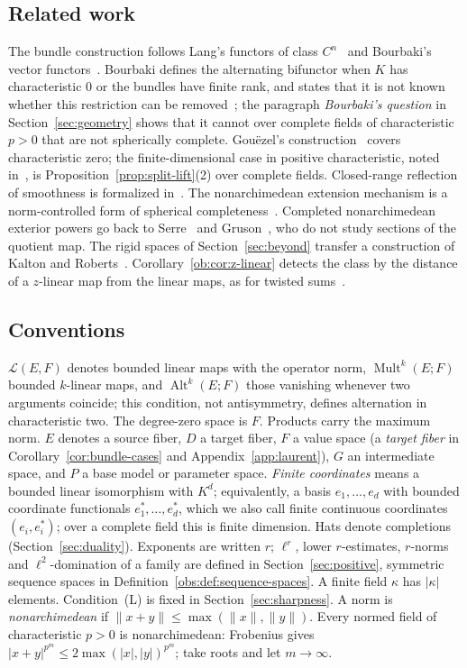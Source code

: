 \documentclass[11pt]{amsart}
\theoremstyle{definition}
\theoremstyle{remark}
\numberwithin{equation}{section}
\newcommand{\cL}{\mathcal L}
\newcommand{\Alt}{\operatorname{Alt}}
\newcommand{\Mult}{\operatorname{Mult}}
\newcommand{\abs}[1]{\lvert #1\rvert}
\newcommand{\norm}[1]{\lVert #1\rVert}
\theoremstyle{plain}
\theoremstyle{definition}
\theoremstyle{plain}
\begin{document}
\subsection*{Related work}
The bundle construction follows Lang's functors of class $C^n$~\cite[Ch.~III, \S4]{La} and Bourbaki's vector
functors~\cite[n\textsuperscript{o}~7.6]{Bou}. Bourbaki defines the alternating bifunctor when $K$ has characteristic
$0$ or the bundles have finite rank, and states that it is not known whether this restriction can be
removed~\cite[n\textsuperscript{o}~7.8]{Bou}; the paragraph \emph{Bourbaki's question} in Section~\ref{sec:geometry}
shows that it cannot over complete fields of characteristic $p>0$ that are not spherically complete. Gou\"ezel's
construction~\cite{G1,G2} covers characteristic zero; the finite-dimensional case in positive characteristic, noted
in~\cite{G1}, is Proposition~\ref{prop:split-lift}(2) over complete fields. Closed-range reflection of smoothness is
formalized in~\cite{PR}. The nonarchimedean extension mechanism is a norm-controlled form of spherical
completeness~\cite{In,Schi,Sch,Yuan}. Completed nonarchimedean exterior powers go back to Serre~\cite{Se} and
Gruson~\cite{Gr}, who do not study sections of the quotient map. The rigid spaces of Section~\ref{sec:beyond} transfer a construction of Kalton and Roberts~\cite{KR}.
Corollary~\ref{ob:cor:z-linear} detects the class by the distance of a $z$-linear map from the linear maps, as for
twisted sums~\cite{Ka,KP,CSC}.

\subsection*{Conventions}
$\cL(E,F)$ denotes bounded linear maps with the operator norm, $\Mult^k(E;F)$ bounded $k$-linear maps, and
$\Alt^k(E;F)$ those vanishing whenever two arguments coincide; this condition, not antisymmetry, defines alternation
in characteristic two. The degree-zero space is $F$. Products carry the maximum norm. $E$ denotes a source fiber, $D$
a target fiber, $F$ a value space (a \emph{target fiber} in Corollary~\ref{cor:bundle-cases} and
Appendix~\ref{app:laurent}), $G$ an intermediate space, and $P$ a base model or parameter space. \emph{Finite
coordinates} means a bounded linear isomorphism with $K^d$; equivalently, a basis $e_1,\ldots,e_d$ with bounded coordinate functionals $e^*_1,\ldots,e^*_d$, which we also call finite continuous coordinates $(e_i,e^*_i)$; over a complete field this is finite dimension. Hats
denote completions (Section~\ref{sec:duality}). Exponents are written $r$; $\ell^r$, lower $r$-estimates, $r$-norms
and $\ell^2$-domination of a family are defined in Section~\ref{sec:positive}, symmetric sequence spaces in
Definition~\ref{obs:def:sequence-spaces}. A finite field $\kappa$ has $\abs\kappa$ elements. Condition~\textup{(L)} is
fixed in Section~\ref{sec:sharpness}. A norm is \emph{nonarchimedean} if $\norm{x+y}\le\max(\norm x,\norm y)$. Every
normed field of characteristic $p>0$ is nonarchimedean: Frobenius gives $\abs{x+y}^{p^m}\le2\max(\abs x,\abs y)^{p^m}$; take roots
and let $m\to\infty$.
\end{document}
